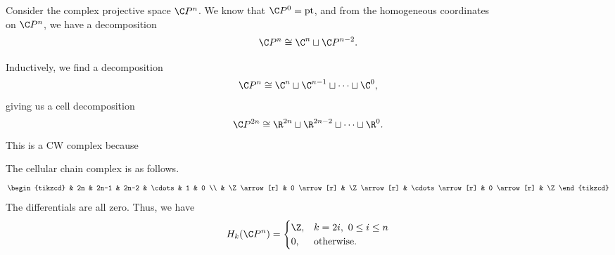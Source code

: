 \documentclass[main.tex]{subfiles}
\begin{document}
\begin{example}
  \label{eg:homology_of_complex_projective_space}
  Consider the complex projective space $\C P^{n}$. We know that $\C P^{0} = \mathrm{pt}$, and from the homogeneous coordinates
  \begin{equation*}
    [x_{0} : \cdots : x_{n}]
  \end{equation*}
  on $\C P^{n}$, we have a decomposition
  \begin{equation*}
    \C P^{n} \cong \C^{n} \sqcup \C P^{n-2}.
  \end{equation*}

  Inductively, we find a decomposition
  \begin{equation*}
    \C P^{n} \cong \C^{n} \sqcup \C^{n-1} \sqcup \cdots \sqcup \C^{0},
  \end{equation*}
  giving us a cell decomposition
  \begin{equation*}
    \C P^{2n} \cong \R^{2n} \sqcup \R^{2n-2} \sqcup \cdots \sqcup \R^{0}.
  \end{equation*}
  This is a CW complex because

  The cellular chain complex is as follows.
  \begin{equation*}
    \begin{tikzcd}
      & 2n
      & 2n-1
      & 2n-2
      & \cdots
      & 1
      & 0
      \\
      & \Z
      \arrow[r]
      & 0
      \arrow[r]
      & \Z
      \arrow[r]
      & \cdots
      \arrow[r]
      & 0
      \arrow[r]
      & \Z
    \end{tikzcd}
  \end{equation*}
  The differentials are all zero. Thus, we have
  \begin{equation*}
    H_{k}(\C P^{n}) =
    \begin{cases}
      \Z, &k = 2i,\ 0 \leq i \leq n \\
      0, & \text{otherwise}.
    \end{cases}
  \end{equation*}
\end{example}
\end{document}

